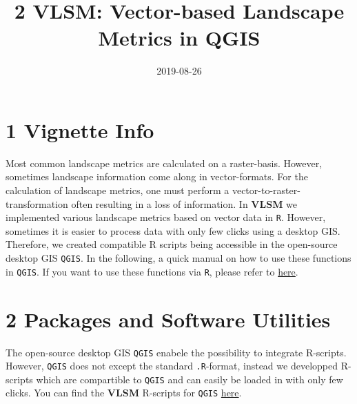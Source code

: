 \documentclass[]{article}
\title{2 VLSM: Vector-based Landscape Metrics in QGIS}
\author{}
\date{2019-08-26}
\begin{document}
\maketitle

\section{1 Vignette Info}\label{vignette-info}

Most common landscape metrics are calculated on a raster-basis. However,
sometimes landscape information come along in vector-formats. For the
calculation of landscape metrics, one must perform a
vector-to-raster-transformation often resulting in a loss of
information. In \textbf{VLSM} we implemented various landscape metrics
based on vector data in \texttt{R}. However, sometimes it is easier to
process data with only few clicks using a desktop GIS. Therefore, we
created compatible R scripts being accessible in the open-source desktop
GIS \texttt{QGIS}. In the following, a quick manual on how to use these
functions in \texttt{QGIS}. If you want to use these functions via
\texttt{R}, please refer to
\href{https://github.com/raff-k/VLSM/blob/master/vignettes/vignette_R.pdf}{here}.

\section{2 Packages and Software
Utilities}\label{packages-and-software-utilities}

The open-source desktop GIS \texttt{QGIS} enabele the possibility to
integrate R-scripts. However, \texttt{QGIS} does not except the standard
\texttt{.R}-format, instead we developped R-scripts which are
compartible to \texttt{QGIS} and can easily be loaded in with only few
clicks. You can find the \textbf{VLSM} R-scripts for \texttt{QGIS}
\href{https://github.com/raff-k/VLSM/blob/master/R_QGIS}{here}.
\end{document}
